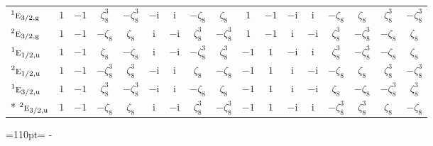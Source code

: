 \documentclass[10pt,a4paper]{article}
\newcommand{\needspace}[1]{\par\penalty-100\begingroup\dimen0=#1\relax\dimen2=\pagegoal
  \advance\dimen2-\pagetotal\ifdim\dimen0>\dimen2\relax\ifdim\dimen2>0pt\vfil\break\fi\fi
  \endgroup}
\numberwithin{equation}{section}
\newcommand{\irr}[1]{\text{\normalfont\scshape #1}}
\newcommand{\conjpair}[1]{{}^{#1}}
\newcommand{\ptag}[1]{\mathrm{#1}}
\newcommand{\iunit}{\mathrm{i}}
\newcommand{\rootunity}[1]{\zeta_{#1}}
\begin{document}
{\begin{longtable}{@{}lcccccccccccccccc@{}}
$\conjpair{1}\irr{e}_{3/2,\ptag{g}}$ & $1$ & $-1$ & $\rootunity{8}^{3}$ & $-\rootunity{8}^{3}$ & $-\iunit{}$ & $\iunit{}$ & $-\rootunity{8}$ & $\rootunity{8}$ & $1$ & $-1$ & $-\iunit{}$ & $\iunit{}$ & $-\rootunity{8}$ & $\rootunity{8}$ & $\rootunity{8}^{3}$ & $-\rootunity{8}^{3}$\\
$\conjpair{2}\irr{e}_{3/2,\ptag{g}}$ & $1$ & $-1$ & $-\rootunity{8}$ & $\rootunity{8}$ & $\iunit{}$ & $-\iunit{}$ & $\rootunity{8}^{3}$ & $-\rootunity{8}^{3}$ & $1$ & $-1$ & $\iunit{}$ & $-\iunit{}$ & $\rootunity{8}^{3}$ & $-\rootunity{8}^{3}$ & $-\rootunity{8}$ & $\rootunity{8}$\\
$\conjpair{1}\irr{e}_{1/2,\ptag{u}}$ & $1$ & $-1$ & $\rootunity{8}$ & $-\rootunity{8}$ & $\iunit{}$ & $-\iunit{}$ & $-\rootunity{8}^{3}$ & $\rootunity{8}^{3}$ & $-1$ & $1$ & $-\iunit{}$ & $\iunit{}$ & $\rootunity{8}^{3}$ & $-\rootunity{8}^{3}$ & $-\rootunity{8}$ & $\rootunity{8}$\\
$\conjpair{2}\irr{e}_{1/2,\ptag{u}}$ & $1$ & $-1$ & $-\rootunity{8}^{3}$ & $\rootunity{8}^{3}$ & $-\iunit{}$ & $\iunit{}$ & $\rootunity{8}$ & $-\rootunity{8}$ & $-1$ & $1$ & $\iunit{}$ & $-\iunit{}$ & $-\rootunity{8}$ & $\rootunity{8}$ & $\rootunity{8}^{3}$ & $-\rootunity{8}^{3}$\\
$\conjpair{1}\irr{e}_{3/2,\ptag{u}}$ & $1$ & $-1$ & $\rootunity{8}^{3}$ & $-\rootunity{8}^{3}$ & $-\iunit{}$ & $\iunit{}$ & $-\rootunity{8}$ & $\rootunity{8}$ & $-1$ & $1$ & $\iunit{}$ & $-\iunit{}$ & $\rootunity{8}$ & $-\rootunity{8}$ & $-\rootunity{8}^{3}$ & $\rootunity{8}^{3}$\\*
$\conjpair{2}\irr{e}_{3/2,\ptag{u}}$ & $1$ & $-1$ & $-\rootunity{8}$ & $\rootunity{8}$ & $\iunit{}$ & $-\iunit{}$ & $\rootunity{8}^{3}$ & $-\rootunity{8}^{3}$ & $-1$ & $1$ & $-\iunit{}$ & $\iunit{}$ & $-\rootunity{8}^{3}$ & $\rootunity{8}^{3}$ & $\rootunity{8}$ & $-\rootunity{8}$\\
\bottomrule\end{longtable}}
\needspace{110pt}
\end{document}
